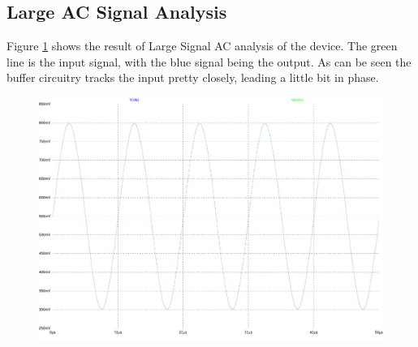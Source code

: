 \subsection{Large AC Signal Analysis}

Figure \ref{fig:Lac} shows the result of Large Signal AC analysis of the device.
The green line is the input signal, with the blue signal being the output.
As can be seen the buffer circuitry tracks the input pretty closely, leading a little bit in phase.

\begin{figure}[H]
	\centering
	\includegraphics[width=\textwidth]{./images/LargeSignal-out.pdf}
	\caption{}
	\label{fig:Lac}
\end{figure}
